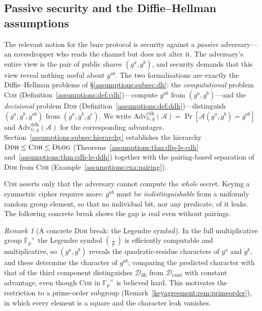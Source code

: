 \documentclass[11pt,a4paper]{article}
\theoremstyle{definition}
\theoremstyle{remark}
\newtheorem{remark}[theorem]{Remark}
\newcommand{\G}{\ensuremath{\mathbb{G}}}
\newcommand{\Fp}{\ensuremath{\mathbb{F}_{p}}}
\newcommand{\legendre}[2]{\left(\frac{#1}{#2}\right)}
\begin{document}
\subsection{Passive security and the Diffie--Hellman assumptions}\label{keyagreement:subsec:security}

The relevant notion for the bare protocol is security against a \emph{passive} adversary---an eavesdropper who reads the channel but does not alter it. The adversary's entire view is the pair of public shares \((g^a, g^b)\), and security demands that this view reveal nothing useful about \(g^{ab}\). The two formalisations are exactly the Diffie--Hellman problems of \S\ref{assumptions:subsec:dh}: the \emph{computational} problem \textsc{Cdh} (Definition~\ref{assumptions:def:cdh})---compute \(g^{ab}\) from \((g^a, g^b)\)---and the \emph{decisional} problem \textsc{Ddh} (Definition~\ref{assumptions:def:ddh})---distinguish \((g^a, g^b, g^{ab})\) from \((g^a, g^b, g^c)\). We write \(\mathrm{Adv}^{\mathrm{cdh}}_{\G,g}(\mathcal{A}) = \Pr[\mathcal{A}(g^a, g^b) = g^{ab}]\) and \(\mathrm{Adv}^{\mathrm{ddh}}_{\G,g}(\mathcal{A})\) for the corresponding advantages. Section~\ref{assumptions:subsec:hierarchy} establishes the hierarchy \(\textsc{Ddh} \le \textsc{Cdh} \le \textsc{Dlog}\) (Theorems~\ref{assumptions:thm:dlp-le-cdh} and~\ref{assumptions:thm:cdh-le-ddh}) together with the pairing-based separation of \textsc{Ddh} from \textsc{Cdh} (Example~\ref{assumptions:exa:pairing}).

\textsc{Cdh} asserts only that the adversary cannot compute the \emph{whole} secret. Keying a symmetric cipher requires more: \(g^{ab}\) must be \emph{indistinguishable} from a uniformly random group element, so that no individual bit, nor any predicate, of it leaks. The following concrete break shows the gap is real even without pairings.

\begin{remark}[A concrete \textsc{Ddh} break: the Legendre symbol]\label{keyagreement:rem:legendre}
In the full multiplicative group \(\Fp^\times\) the Legendre symbol \(\legendre{\,\cdot\,}{p}\) is efficiently computable and multiplicative, so \((g^a, g^b)\) reveals the quadratic-residue characters of \(g^a\) and \(g^b\), and these determine the character of \(g^{ab}\); comparing the predicted character with that of the third component distinguishes \(\mathcal{D}_{\mathrm{dh}}\) from \(\mathcal{D}_{\mathrm{rand}}\) with constant advantage, even though \textsc{Cdh} in \(\Fp^\times\) is believed hard. This motivates the restriction to a prime-order subgroup (Remark~\ref{keyagreement:rem:primeorder}), in which every element is a square and the character leak vanishes.
\end{remark}
\end{document}
